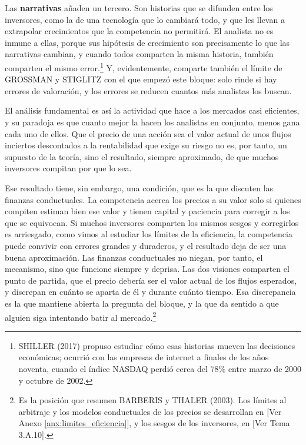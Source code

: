 \documentclass[10pt,a4paper]{article}
\newcommand{\authorfont}[1]{{\fontfamily{EBGaramond-TLF}\selectfont #1}}
\begin{document}
Las \textbf{narrativas} añaden un tercero. Son historias que se difunden entre los inversores, como la de una tecnología que lo cambiará todo, y que les llevan a extrapolar crecimientos que la competencia no permitirá. El analista no es inmune a ellas, porque sus hipótesis de crecimiento son precisamente lo que las narrativas cambian, y cuando todos comparten la misma historia, también comparten el mismo error.\footnote{%
    SHILLER (2017) propuso estudiar cómo esas historias mueven las decisiones económicas; ocurrió con las empresas de internet a finales de los años noventa, cuando el índice NASDAQ perdió cerca del $78\%$ entre marzo de 2000 y octubre de 2002.
} Y, evidentemente, comparte también el límite de GROSSMAN y STIGLITZ con el que empezó este bloque: solo rinde si hay errores de valoración, y los errores se reducen cuantos más analistas los buscan.

El análisis fundamental es así la actividad que hace a los mercados casi eficientes, y su paradoja es que cuanto mejor la hacen los analistas en conjunto, menos gana cada uno de ellos. Que el precio de una acción sea el valor actual de unos flujos inciertos descontados a la rentabilidad que exige su riesgo no es, por tanto, un supuesto de la teoría, sino el resultado, siempre aproximado, de que muchos inversores compitan por que lo sea.

Ese resultado tiene, sin embargo, una condición, que es la que discuten las finanzas conductuales. La competencia acerca los precios a su valor solo si quienes compiten estiman bien ese valor y tienen capital y paciencia para corregir a los que se equivocan. Si muchos inversores comparten los mismos sesgos y corregirlos es arriesgado, como vimos al estudiar los límites de la eficiencia, la competencia puede convivir con errores grandes y duraderos, y el resultado deja de ser una buena aproximación. Las finanzas conductuales no niegan, por tanto, el mecanismo, sino que funcione siempre y deprisa. Las dos visiones comparten el punto de partida, que el precio debería ser el valor actual de los flujos esperados, y discrepan en cuánto se aparta de él y durante cuánto tiempo. Esa discrepancia es la que mantiene abierta la pregunta del bloque, y la que da sentido a que alguien siga intentando batir al mercado.\footnote{%
    Es la posición que resumen BARBERIS y THALER (2003). Los límites al arbitraje y los modelos conductuales de los precios se desarrollan en [\authorfont{Ver Anexo \ref{anx:limites_eficiencia}}], y los sesgos de los inversores, en [\authorfont{Ver Tema 3.A.10}].
}
\end{document}
